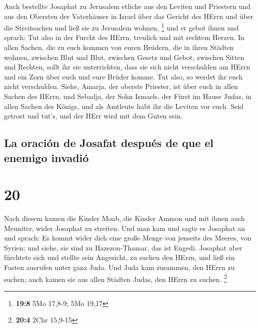  Auch bestellte Josaphat zu Jerusalem etliche aus den
Leviten und Priestern und aus den Obersten der Vaterhäuser in Israel
über das Gericht des HErrn und über die Streitsachen und ließ sie zu
Jerusalem wohnen, \footnote{\textbf{19:8} 5Mo 17,8-9; 5Mo 19,17}
 und er gebot ihnen und sprach: Tut also in der Furcht des
HErrn, treulich und mit rechtem Herzen.  In allen Sachen,
die zu euch kommen von euren Brüdern, die in ihren Städten wohnen,
zwischen Blut und Blut, zwischen Gesetz und Gebot, zwischen Sitten und
Rechten, sollt ihr sie unterrichten, dass sie sich nicht verschulden am
HErrn und ein Zorn über euch und eure Brüder komme. Tut also, so werdet
ihr euch nicht verschulden.  Siehe, Amarja, der oberste
Priester, ist über euch in allen Sachen des HErrn, und Sebadja, der Sohn
Ismaels, der Fürst im Hause Judas, in allen Sachen des Königs, und als
Amtleute habt ihr die Leviten vor euch. Seid getrost und tut's, und der
HErr wird mit dem Guten sein.

\hypertarget{la-oraciuxf3n-de-josafat-despuuxe9s-de-que-el-enemigo-invadiuxf3}{%
\subsection{La oración de Josafat después de que el enemigo
invadió}\label{la-oraciuxf3n-de-josafat-despuuxe9s-de-que-el-enemigo-invadiuxf3}}

\hypertarget{section-19}{%
\section{20}\label{section-19}}

 Nach diesem kamen die Kinder Moab, die Kinder Ammon und
mit ihnen auch Meuniter, wider Josaphat zu streiten.  Und
man kam und sagte es Josaphat an und sprach: Es kommt wider dich eine
große Menge von jenseits des Meeres, von Syrien; und siehe, sie sind zu
Hazezon-Thamar, das ist Engedi.  Josaphat aber fürchtete
sich und stellte sein Angesicht, zu suchen den HErrn, und ließ ein
Fasten ausrufen unter ganz Juda.  Und Juda kam zusammen,
den HErrn zu suchen; auch kamen sie aus allen Städten Judas, den HErrn
zu suchen. \footnote{\textbf{20:4} 2Chr 15,9-15}


